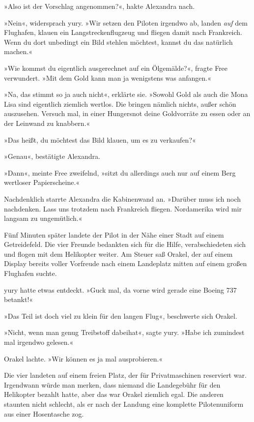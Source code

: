 »Also ist der Vorschlag angenommen?«, hakte Alexandra nach.

»Nein«, widersprach yury. »Wir setzen den Piloten irgendwo ab, landen \textit{auf} dem Flughafen, klauen ein Langstreckenflugzeug und fliegen damit nach Frankreich. Wenn du dort unbedingt ein Bild stehlen möchtest, kannst du das natürlich machen.«

»Wie kommst du eigentlich ausgerechnet auf ein Ölgemälde?«, fragte Free verwundert. »Mit dem Gold kann man ja wenigstens was anfangen.«

»Na, das stimmt so ja auch nicht«, erklärte sie. »Sowohl Gold als auch die Mona Lisa sind eigentlich ziemlich wertlos. Die bringen nämlich nichts, außer schön auszusehen. Versuch mal, in einer Hungersnot deine Goldvorräte zu essen oder an der Leinwand zu knabbern.«

»Das heißt, du möchtest das Bild klauen, um es zu verkaufen?«

»Genau«, bestätigte Alexandra.

»Dann«, meinte Free zweifelnd, »sitzt du allerdings auch nur auf einem Berg wertloser Papierscheine.«

Nachdenklich starrte Alexandra die Kabinenwand an. »Darüber muss ich noch nachdenken. Lass uns trotzdem nach Frankreich fliegen. Nordamerika wird mir langsam zu ungemütlich.«

Fünf Minuten später landete der Pilot in der Nähe einer Stadt auf einem Getreidefeld. Die vier Freunde bedankten sich für die Hilfe, verabschiedeten sich und flogen mit dem Helikopter weiter. Am Steuer saß Orakel, der auf einem Display bereits voller Vorfreude nach einem Landeplatz mitten auf einem großen Flughafen suchte.

yury hatte etwas entdeckt. »Guck mal, da vorne wird gerade eine Boeing 737 betankt!«

»Das Teil ist doch viel zu klein für den langen Flug«, beschwerte sich Orakel.

»Nicht, wenn man genug Treibstoff dabeihat«, sagte yury. »Habe ich zumindest mal irgendwo gelesen.«

Orakel lachte. »Wir können es ja mal ausprobieren.«

Die vier landeten auf einem freien Platz, der für Privatmaschinen reserviert war. Irgendwann würde man merken, dass niemand die Landegebühr für den Helikopter bezahlt hatte, aber das war Orakel ziemlich egal. Die anderen staunten nicht schlecht, als er nach der Landung eine komplette Pilotenuniform aus einer Hosentasche zog.

